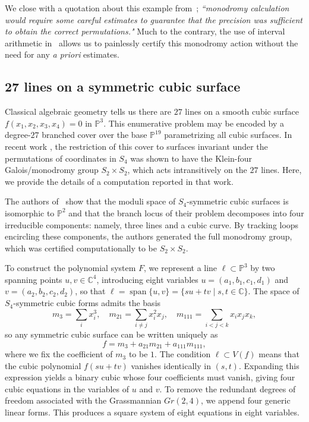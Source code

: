\documentclass[11pt]{amsart}
\theoremstyle{definition}
\theoremstyle{remark}
\begin{document}
We close with a quotation about this example from~\cite{elkies2013complex};
\textit{``monodromy calculation would require some careful estimates to guarantee that the precision was
sufficient to obtain the correct permutations."} 
Much to the contrary, the use of interval arithmetic in~ allows us to painlessly certify this monodromy action without the need for any \textit{a priori} estimates.


\subsection{27 lines on a symmetric cubic surface}\label{sec:27-lines}
Classical algebraic geometry tells us there are $27$ lines on a smooth cubic surface $f(x_1,x_2,x_3,x_4)=0$ in $\mathbb{P}^3.$ 
This enumerative problem may be encoded by a degree-$27$ branched cover over the base $\mathbb{P}^{19}$ parametrizing all cubic surfaces.
In recent work \cite{brazelton2024monodromy}, the restriction of this cover to surfaces invariant under the permutations of coordinates in $S_4$ was shown to have the Klein-four Galois/monodromy group $S_2\times S_2$, which acts intransitively on the $27$ lines. 
Here, we provide the details of a computation reported in that work.

The authors of~\cite{brazelton2024monodromy} show that the moduli space of $S_4$-symmetric cubic surfaces is isomorphic to $\mathbb{P}^2$ and that the branch locus of their problem decomposes into four irreducible components: namely, three lines and a cubic curve. By tracking loops encircling these components, the authors generated the full monodromy group, which was certified computationally to be $S_2\times S_2$.

To construct the polynomial system $F$, we represent a line $\ell \subset \mathbb{P}^3$ by two spanning points $u, v \in \mathbb{C}^4$, introducing eight variables
$u=(a_1,b_1,c_1,d_1)$ and $ v=(a_2,b_2,c_2,d_2)$, so that $\ell = \operatorname{span}\{u,v\} = \{su + tv \mid s,t \in \mathbb{C}\}$. The space of $S_4$-symmetric cubic forms admits the basis \cite[Section~2.3]{brazelton2024monodromy}
\[
m_3=\sum_i x_i^3,\quad 
m_{21}=\sum_{i\neq j} x_i^2 x_j,\quad 
m_{111}=\sum_{i<j<k} x_i x_j x_k,
\]
so any symmetric cubic surface can be written uniquely as
\[
f = m_3 + a_{21} m_{21} + a_{111} m_{111},
\]
where we fix the coefficient of $m_3$ to be $1$. The condition $\ell \subset V(f)$ means that the cubic polynomial $f(su+tv)$ vanishes identically in $(s,t)$. Expanding this expression yields a binary cubic whose four coefficients must vanish, giving four cubic equations in the variables of $u$ and $v$. To remove the redundant degrees of freedom associated with the Grassmannian $Gr(2,4)$, we append four generic linear forms. This produces a square system of eight equations in eight variables.
\end{document}

